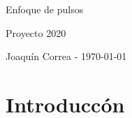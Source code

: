 \documentclass{article}
\begin{document}
  \begin{center}
    {\sc \large Enfoque de pulsos}
    
    {\sc \large Proyecto 2020}
    \linebreak

    {\rm Joaquín Correa - \today}
  \end{center}

  \section*{Introduccón}
  
\end{document}
